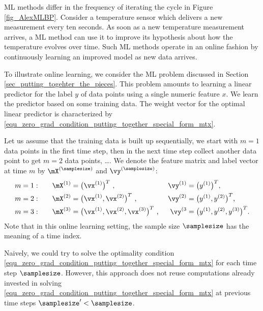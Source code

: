 \documentclass[12pt]{report}
\begin{document}
ML methods differ in the frequency of iterating the cycle in Figure \ref{fig_AlexMLBP}. Consider a 
temperature sensor which delivers a new measurement every ten seconds. As soon as a new 
temperature measurement arrives, a ML method can use it to improve its hypothesis about 
how the temperature evolves over time. Such ML methods operate in an online fashion by 
continuously learning an improved model as new data arrives.  

To illustrate online learning, we consider the ML problem discussed in Section \ref{sec_putting_togehter_the_pieces}. 
This problem amounts to learning a linear predictor for the label $y$ of data points 
using a single numeric feature $x$. We learn the predictor based on some training 
data. The weight vector for the optimal linear predictor is characterized by \eqref{equ_zero_grad_condition_putting_together_special_form_mtx}. 

Let us assume that the training data is built up sequentially, we start with $m=1$ data points 
in the first time step, then in the next time step collect another data point to get 
$m=2$ data points, \ldots. We denote the feature matrix and label vector at time $m$ 
by $\mX^{(\samplesize)}$ and $\vy^{(\samplesize)}$: 
\begin{align}
m&=1: \quad &\mX^{(1)} & = \big( \vx^{(1)} \big)^{T}  \mbox{ , } & \vy^{(1)} & = \big( y^{(1)} \big)^{T} \mbox{, } \\ 
m&=2: \quad &\mX^{(2)} & = \big( \vx^{(1)},\vx^{(2)} \big)^{T}  \mbox{ , } & \vy^{(2)} & = \big( y^{(1)},y^{(2)} \big)^{T} \mbox{, } \\ 
m&=3: \quad &\mX^{(3)} & = \big( \vx^{(1)},\vx^{(2)},\vx^{(3)} \big)^{T}  \mbox{ , } & \vy^{(3} & = \big( y^{(1)},y^{(2)},y^{(3)} \big)^{T}.
\end{align} 
Note that in this online learning setting, the sample size $\samplesize$ has the meaning of a time index. 

Naively, we could try to solve the optimality condition \eqref{equ_zero_grad_condition_putting_together_special_form_mtx} 
for each time step $\samplesize$. However, this approach does not reuse computations already invested 
in solving \eqref{equ_zero_grad_condition_putting_together_special_form_mtx} at previous time steps $\samplesize' < \samplesize$. 
\end{document}
